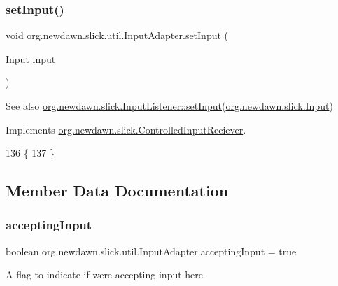 \subsubsection{\texorpdfstring{set\+Input()}{setInput()}}
{\footnotesize\ttfamily void org.\+newdawn.\+slick.\+util.\+Input\+Adapter.\+set\+Input (\begin{DoxyParamCaption}\item[{\mbox{\hyperlink{classorg_1_1newdawn_1_1slick_1_1_input}{Input}}}]{input }\end{DoxyParamCaption})\hspace{0.3cm}{\ttfamily [inline]}}

\begin{DoxySeeAlso}{See also}
\mbox{\hyperlink{interfaceorg_1_1newdawn_1_1slick_1_1_controlled_input_reciever_ab838ca221a429b05c0b53aea9b4fe72f}{org.\+newdawn.\+slick.\+Input\+Listener\+::set\+Input}}(\mbox{\hyperlink{classorg_1_1newdawn_1_1slick_1_1_input}{org.\+newdawn.\+slick.\+Input}}) 
\end{DoxySeeAlso}


Implements \mbox{\hyperlink{interfaceorg_1_1newdawn_1_1slick_1_1_controlled_input_reciever_ab838ca221a429b05c0b53aea9b4fe72f}{org.\+newdawn.\+slick.\+Controlled\+Input\+Reciever}}.


\begin{DoxyCode}
136                                       \{
137     \}
\end{DoxyCode}


\subsection{Member Data Documentation}
\mbox{\label{classorg_1_1newdawn_1_1slick_1_1util_1_1_input_adapter_a29236557cf2412c8f843886d2453c650}} 
\subsubsection{\texorpdfstring{accepting\+Input}{acceptingInput}}
{\footnotesize\ttfamily boolean org.\+newdawn.\+slick.\+util.\+Input\+Adapter.\+accepting\+Input = true\hspace{0.3cm}{\ttfamily [private]}}

A flag to indicate if we\textquotesingle{}re accepting input here 